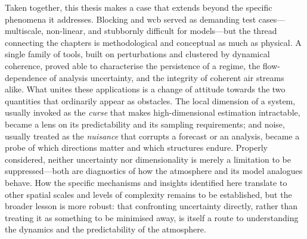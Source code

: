 Taken together, this thesis makes a case that extends beyond the
specific phenomena it addresses. Blocking and \gls{wcb} served as
demanding test cases---multiscale, non-linear, and stubbornly difficult for
models---but the thread connecting the chapters is
methodological and conceptual as much as physical. A single family of
tools, built on perturbations and clustered by
dynamical coherence, proved able to characterise the persistence of a
regime, the flow-dependence of analysis uncertainty, and the integrity of
coherent air streams alike. What unites these applications is a change of
attitude towards the two quantities that ordinarily appear as obstacles. The
local dimension of a system, usually invoked as the \emph{curse} that makes
high-dimensional estimation intractable, became a lens on its predictability
and its sampling requirements; and noise, usually treated as the
\emph{nuisance} that corrupts a forecast or an analysis, became a probe of
which directions matter and which structures endure. Properly considered,
neither uncertainty nor dimensionality is merely a limitation to be
suppressed---both are diagnostics of how the atmosphere and its model analogues
behave.
How the specific mechanisms and insights identified here translate to other
spatial scales and levels of complexity remains to be established, but the
broader lesson is more robust:
that confronting uncertainty directly, rather than treating it as something
to be minimised away, is itself a route to understanding the dynamics and
the predictability of the atmosphere.
